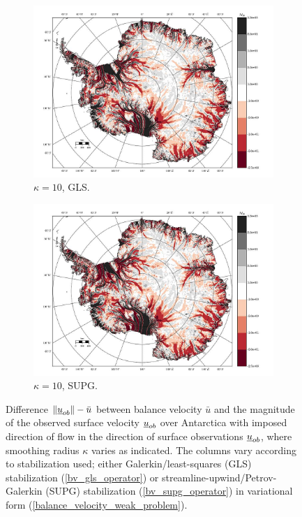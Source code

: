 \begin{figure}
  \begin{subfigure}[b]{0.45\linewidth}
    \includegraphics[width=\linewidth]{images/balance_velocity/antarctica/d_U_ob/misfit_10H_kappa_10_GLS.jpg}
  \caption{$\kappa = 10$, GLS.}
  \label{antarctica_bv_image_kappa_5_GLS_U_ob_misfit}
  \end{subfigure}
  \begin{subfigure}[b]{0.45\linewidth}
    \includegraphics[width=\linewidth]{images/balance_velocity/antarctica/d_U_ob/misfit_10H_kappa_10_SUPG.jpg}
  \caption{$\kappa = 10$, SUPG.}
  \label{antarctica_bv_image_kappa_5_SUPG_U_ob_misfit}
  \end{subfigure}
  
  \caption[Antarctica balance-velocity misfit with $\mathbf{d}^{\text{data}} = \mathbf{u}_{ob}$.]{Difference $\Vert \underline{u}_{ob} \Vert - \bar{u}$ between balance velocity $\bar{u}$ and the magnitude of the observed surface velocity $\underline{u}_{ob}$ over Antarctica with imposed direction of flow in the direction of surface observations $\underline{u}_{ob}$, where smoothing radius $\kappa$ varies as indicated.  The columns vary according to  stabilization used; either Galerkin/least-squares (GLS) stabilization (\ref{bv_gls_operator}) or streamline-upwind/Petrov-Galerkin (SUPG) stabilization (\ref{bv_supg_operator}) in variational form (\ref{balance_velocity_weak_problem}). \newline \newline}
  

\end{figure}
